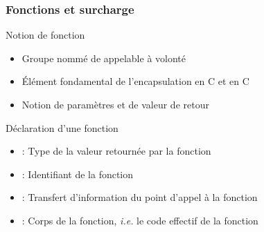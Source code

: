 \documentclass[svgnames]{beamer}
\def\C++{\textup{C}\nolinebreak[4]\hspace{-.05em}\raisebox{.4ex}{\relsize{-3}{\textbf{++}}}}
\begin{document}
\begin{frame}
  \frametitle{Fonctions et surcharge}
  \begin{block}{Notion de fonction}
  \begin{itemize}
  \item Groupe nommé de  appelable à volonté
  \item Élément fondamental de l'encapsulation en C et en \C++
  \item Notion de paramètres et de valeur de retour
  \end{itemize}
  \end{block}

\begin{overlayarea}{\textwidth}{4cm}
{
  \begin{block}{Déclaration d'une fonction}\footnotesize
  \begin{center}\footnotesize{}\end{center}
  \vspace{-0.5cm}
  \begin{itemize}\footnotesize
  \item {} : Type de la valeur retournée par la fonction
  \item {} : Identifiant de la fonction
  \item {} : Transfert d'information du point d'appel à la fonction
  \item {} : Corps de la fonction, \textit{i.e.} le code effectif de la fonction
  \end{itemize}
  \end{block}
}

\end{overlayarea}
\end{frame}
\end{document}
